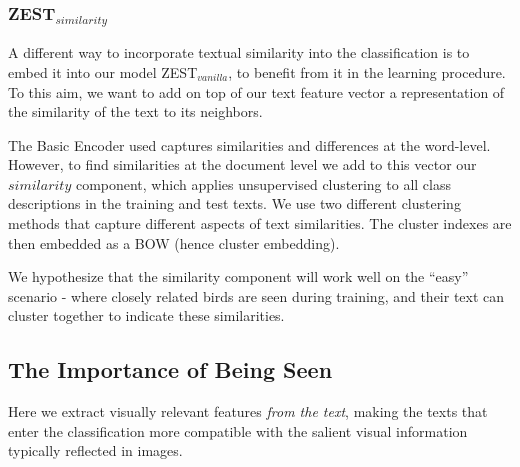 \documentclass[11pt,a4paper]{article}
\newcommand\yuval[1]{\textcolor{darkpink}{\textbf{YUVAL:} #1 }}
\newcommand\reut[1]{\textcolor{green}{\textbf{REUT:} #1 }}
\begin{document}
\subsubsection{ZEST$_{similarity}$}

A different way to incorporate textual similarity into the classification is to embed it into our model ZEST$_{vanilla}$, to benefit from it in the learning procedure. To this aim, we want to add on top of our text feature vector a representation of the similarity of the text to its neighbors. \par


The Basic Encoder used captures similarities and differences at the word-level. However, to find similarities at the document level we add to this vector our $similarity$ component, %
which applies unsupervised clustering to all class descriptions in the training and test texts. We use two different clustering methods that capture different aspects of text similarities. The cluster indexes are then embedded as a BOW (hence cluster embedding). \par


\par
We hypothesize that the similarity component will work well on the \enquote{easy} scenario - where closely related birds are seen during training, and their text can cluster together to indicate these similarities.

\subsection{The Importance of Being Seen}
\label{section:vrs_component}

Here we extract visually relevant features \textit{from the text}, making the texts that enter the classification more compatible with the salient visual information typically reflected in images. 
\end{document}
